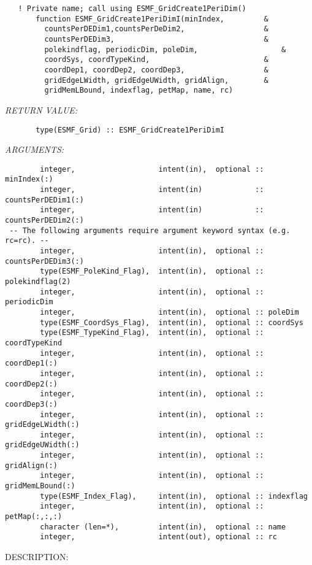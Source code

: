  
\begin{verbatim}   ! Private name; call using ESMF_GridCreate1PeriDim()
       function ESMF_GridCreate1PeriDimI(minIndex,         &
         countsPerDEDim1,countsPerDeDim2,                  &
         countsPerDEDim3,                                  &
         polekindflag, periodicDim, poleDim,                   &
         coordSys, coordTypeKind,                          &
         coordDep1, coordDep2, coordDep3,                  &
         gridEdgeLWidth, gridEdgeUWidth, gridAlign,        &
         gridMemLBound, indexflag, petMap, name, rc)\end{verbatim}{\em RETURN VALUE:}
\begin{verbatim}       type(ESMF_Grid) :: ESMF_GridCreate1PeriDimI\end{verbatim}{\em ARGUMENTS:}
\begin{verbatim}        integer,                   intent(in),  optional :: minIndex(:)
        integer,                   intent(in)            :: countsPerDEDim1(:)
        integer,                   intent(in)            :: countsPerDEDim2(:)
 -- The following arguments require argument keyword syntax (e.g. rc=rc). --
        integer,                   intent(in),  optional :: countsPerDEDim3(:)
        type(ESMF_PoleKind_Flag),  intent(in),  optional :: polekindflag(2)
        integer,                   intent(in),  optional :: periodicDim
        integer,                   intent(in),  optional :: poleDim
        type(ESMF_CoordSys_Flag),  intent(in),  optional :: coordSys
        type(ESMF_TypeKind_Flag),  intent(in),  optional :: coordTypeKind
        integer,                   intent(in),  optional :: coordDep1(:)
        integer,                   intent(in),  optional :: coordDep2(:)
        integer,                   intent(in),  optional :: coordDep3(:)
        integer,                   intent(in),  optional :: gridEdgeLWidth(:)
        integer,                   intent(in),  optional :: gridEdgeUWidth(:)
        integer,                   intent(in),  optional :: gridAlign(:)
        integer,                   intent(in),  optional :: gridMemLBound(:)
        type(ESMF_Index_Flag),     intent(in),  optional :: indexflag
        integer,                   intent(in),  optional :: petMap(:,:,:)
        character (len=*),         intent(in),  optional :: name
        integer,                   intent(out), optional :: rc\end{verbatim}
{\sf DESCRIPTION:\\ }


